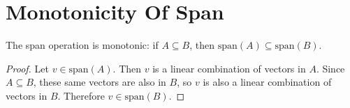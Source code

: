 \section{Monotonicity Of Span}

\begin{theorem}
  \label{theorem : span_mono}
  \leanok
  The span operation is monotonic: if $A \subseteq B$, then $\text{span}(A) \subseteq \text{span}(B)$.
\end{theorem}

\begin{proof}
  Let $v \in \text{span}(A)$. Then $v$ is a linear combination of vectors in $A$. Since $A \subseteq B$, these same vectors are also in $B$, so $v$ is also a linear combination of vectors in $B$. Therefore $v \in \text{span}(B)$.
\end{proof}
